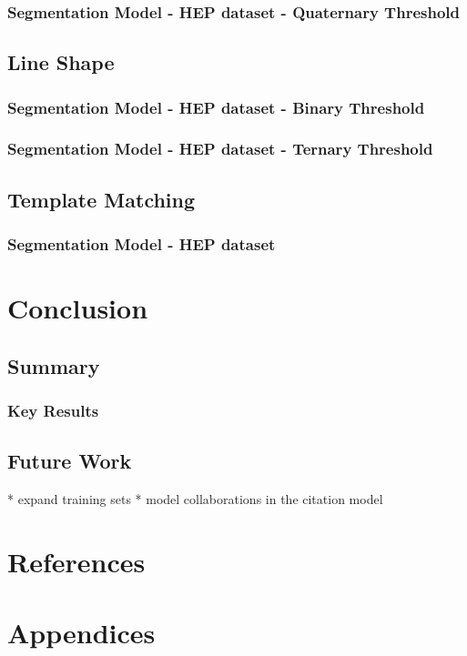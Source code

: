 \documentclass[10pt, oneside]{scrartcl}   	%
\begin{document}
\subsubsection{Segmentation Model - HEP dataset - Quaternary Threshold}
\subsection{Line Shape}
\subsubsection{Segmentation Model - HEP dataset - Binary Threshold}
\subsubsection{Segmentation Model - HEP dataset - Ternary Threshold}
\subsection{Template Matching}
\subsubsection{Segmentation Model - HEP dataset}
\section{Conclusion}
\subsection{Summary}
\subsubsection{Key Results}
\subsection{Future Work}
* expand training sets
* model collaborations in the citation model
\section{References}
\section{Appendices}


\end{document}
